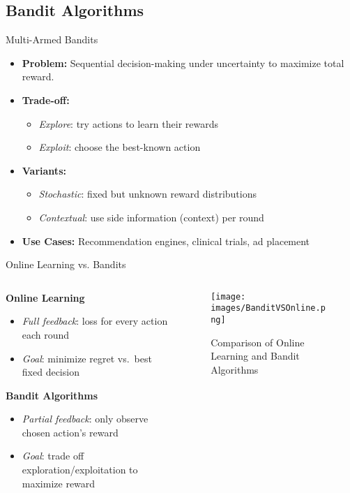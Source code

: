 \documentclass{beamer}
\begin{document}
\subsection{Bandit Algorithms}
\begin{frame}{Multi-Armed Bandits}
  \begin{itemize}
    \item \textbf{Problem:} Sequential decision-making under uncertainty to maximize total reward.
    \item \textbf{Trade-off:}
          \begin{itemize}
            \item \emph{Explore}: try actions to learn their rewards
            \item \emph{Exploit}: choose the best-known action
          \end{itemize}
    \item \textbf{Variants:}
          \begin{itemize}
            \item \emph{Stochastic}: fixed but unknown reward distributions
            \item \emph{Contextual}: use side information (context) per round
          \end{itemize}
    \item \textbf{Use Cases:}
          Recommendation engines, clinical trials, ad placement
  \end{itemize}
\end{frame}

\begin{frame}{Online Learning vs. Bandits}
  \begin{columns}[T]
    \begin{column}{0.6\textwidth}
      \textbf{Online Learning}
      \begin{itemize}
        \item \emph{Full feedback}: loss for every action each round
        \item \emph{Goal}: minimize regret vs.\ best fixed decision
      \end{itemize}
      \vspace{1em}
      \textbf{Bandit Algorithms}
      \begin{itemize}
        \item \emph{Partial feedback}: only observe chosen action’s reward
        \item \emph{Goal}: trade off exploration/exploitation to maximize reward
      \end{itemize}
    \end{column}
    \begin{column}{0.4\textwidth}
      \begin{figure}
        \centering
        \texttt{[image: images/BanditVSOnline.png]}
        \caption{Comparison of Online Learning and Bandit Algorithms}
      \end{figure}
    \end{column}
  \end{columns}
\end{frame}
\end{document}
